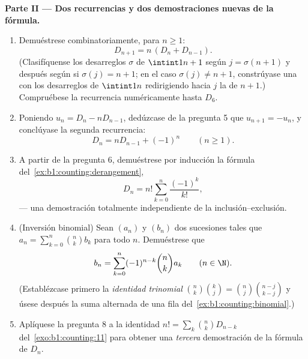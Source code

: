 \begin{problem}
\medskip
\noindent\textbf{Parte II --- Dos recurrencias y dos demostraciones
nuevas de la fórmula.}
\begin{enumerate}[resume]
  \item Demuéstrese combinatoriamente, para $n \geq 1$:
        \[
        D_{n+1} = n\,(D_n + D_{n-1}) .
        \]
        (Clasifíquense los desarreglos $\sigma$ de $\intint1{n+1}$ según
        $j = \sigma(n+1)$ y después según si $\sigma(j) = n + 1$; en el
        caso $\sigma(j) \neq n+1$, constrúyase una  con los
        desarreglos de $\intint1n$ redirigiendo hacia $j$ la
         de $n + 1$.) Compruébese la recurrencia
        numéricamente hasta $D_6$.
  \item Poniendo $u_n = D_n - n D_{n-1}$, dedúzcase de la pregunta 5
        que $u_{n+1} = -u_n$, y conclúyase la segunda recurrencia:
        \[
        D_n = n D_{n-1} + (-1)^n \qquad (n \geq 1).
        \]
  \item A partir de la pregunta 6, demuéstrese por inducción la fórmula
        del~\cref{ex:b1:counting:derangement},
        \[
        D_n = n! \sum_{k=0}^{n} \frac{(-1)^k}{k!},
        \]
        --- una demostración totalmente independiente de la inclusión--exclusión.
  \item (Inversión binomial) Sean $(a_n)$ y $(b_n)$ dos sucesiones
        tales que $a_n = \sum_{k=0}^n \binom nk b_k$ para todo $n$.
        Demuéstrese que
        \[
        b_n = \sum_{k=0}^{n} (-1)^{n-k} \binom nk a_k
        \qquad (n \in \N).
        \]
        (Establézcase primero la \emph{identidad trinomial}
        $\binom nk \binom kj = \binom nj \binom{n-j}{k-j}$ y úsese
        después la suma alternada de una fila
        del~\cref{ex:b1:counting:binomial}.)
  \item Aplíquese la pregunta 8 a la identidad
        $n! = \sum_k \binom nk D_{n-k}$ del~\cref{exo:b1:counting:11}
        para obtener una \emph{tercera} demostración de la fórmula
        de $D_n$.
\end{enumerate}


\end{problem}
